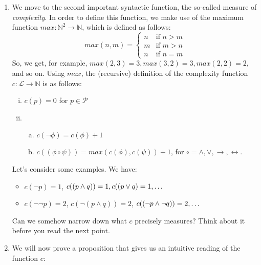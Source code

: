 \begin{enumerate}[\thesection.1]
\begin{proof}
\begin{enumerate}[(i)]
\begin{enumerate}[(a)]
				\end{enumerate}
		
		\end{enumerate}
		We can thus use induction to infer that the claim holds for all $\phi$.		
		\end{proof}

	\item We move to the second important syntactic function, the so-called measure of \emph{complexity}. In order to define this function, we make use of the maximum function $max:\mathbb{N}^2\to\mathbb{N}$, which is defined as follows:
	\[max(n,m)=\begin{cases} n &\text{if }n>m\\ m &\text{if }m>n\\n& \text{if }n=m\end{cases}\] So, we get, for example, $max(2,3)=3, max(3,2)=3, max(2,2)=2$, and so on. Using $max$, the (recursive) definition of the complexity function $c:\mathcal{L}\to\mathbb{N}$ is as follows:
	\begin{enumerate}[(i)]
	
		\item $c(p)=0$ for $p\in\mathcal{P}$
		
		\item \begin{enumerate}[(a)]
		
			\item $c(\neg\phi)=c(\phi)+1$
			
			\item $c((\phi\circ\psi))=max(c(\phi), c(\psi))+1$, for $\circ=\land,\lor,\to,\leftrightarrow$.
		
		\end{enumerate}
	
	\end{enumerate}
Let's consider some examples. We have:
	\begin{itemize}
	
		\item $c(\neg p)=1$, $c((p\land q))=1, c((p\lor q)=1, \mathellipsis$
		
		\item $c(\neg\neg p)=2$, $c(\neg (p\land q))=2$, $c((\neg p\land \neg q))=2, \mathellipsis$
	
	\end{itemize}
	
	Can we somehow narrow down what $c$ precisely measures? Think about it before you read the next point. 

	\item We will now prove a proposition that gives us an intuitive reading of the function $c$:
	

\end{enumerate}
